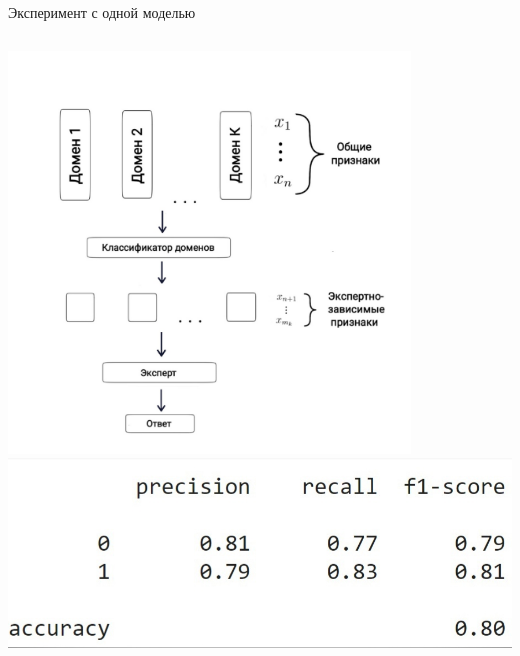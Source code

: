 \documentclass{beamer}
\begin{document}
\begin{frame}{Эксперимент с одной моделью}
\begin{columns}[c]
\includegraphics[width=0.8\textwidth]{Schem_1.jpg}
\includegraphics[width=1.0\textwidth]{res.jpg}
\end{columns}


\end{frame}
\end{document}
